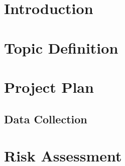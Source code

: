 \documentclass[a4paper]{article}
\begin{document}
\section{Introduction}

\section{Topic Definition}
\section{Project Plan}
\subsection{Data Collection}

\section{Risk Assessment}
\end{document}

